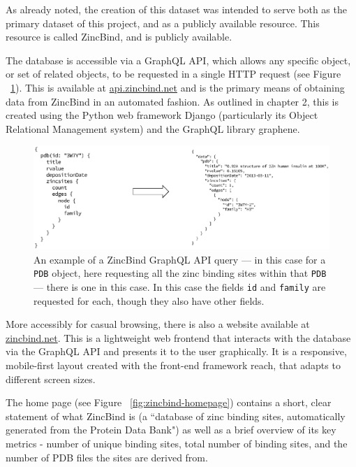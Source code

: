 As already noted, the creation of this dataset was intended to serve both as the primary dataset of this project, and as a publicly available resource. This resource is called ZincBind, and is publicly available.

The database is accessible via a GraphQL API, which allows any specific object, or set of related objects, to be requested in a single HTTP request (see Figure ~\ref{fig:zincbind-api-example}). This is available at \url{api.zincbind.net} and is the primary means of obtaining data from ZincBind in an automated fashion. As outlined in chapter 2, this is created using the Python web framework Django (particularly its Object Relational Management system) and the GraphQL library graphene.

\begin{figure}
\centering
\includegraphics[width=1.0\textwidth]{Figures/zincbind-api-example.eps}
\caption{\label{fig:zincbind-api-example} An example of a ZincBind GraphQL API query
--- in this case for a \texttt{PDB} object,
here requesting all the zinc binding sites within that \texttt{PDB} --- there is
one in this case. In this case the fields \texttt{id} and \texttt{family} are
requested for each, though they also have other fields.}
\end{figure}

More accessibly for casual browsing, there is also a website available at \url{zincbind.net}. This is a lightweight web frontend that interacts with the database via the GraphQL API and presents it to the user graphically. It is a responsive, mobile-first layout created with the front-end framework reach, that adapts to different screen sizes.

The home page (see Figure ~\ref{fig:zincbind-homepage}) contains a short, clear statement of what ZincBind is (a ``database of zinc binding sites, automatically generated from the Protein Data Bank") as well as a brief overview of its key metrics - number of unique binding sites, total number of binding sites, and the number of PDB files the sites are derived from.

